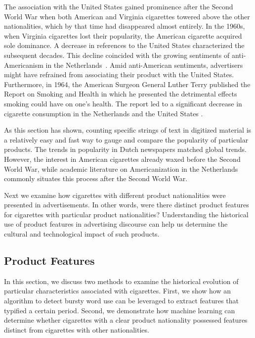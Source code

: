 \documentclass[USenglish]{article}
\begin{document}
The association with the United States gained prominence after the Second World War when both American and Virginia cigarettes towered above the other nationalities, which by that time had disappeared almost entirely. In the 1960s, when Virginia cigarettes lost their popularity, the American cigarette acquired sole dominance. A decrease in references to the United States characterized the subsequent decades.
%
This decline coincided with the growing sentiments of anti-Americanism in the Netherlands~\cite{kroes_european_2006,gienow-hecht_always_2006}. Amid anti-American sentiments, advertisers might have refrained from associating their product with the United States. Furthermore, in 1964, the American Surgeon General Luther Terry published the Report on Smoking and Health in which he presented the detrimental effects smoking could have on one’s health. The report led to a significant decrease in cigarette consumption in the Netherlands and the United States \cite{hoffmann_less_2001}.

As this section has shown, counting specific strings of text in digitized material is a relatively easy and fast way to gauge and compare the popularity of particular products. The trends in popularity in Dutch newspapers matched global trends. However, the interest in American cigarettes already waxed before the Second World War, while academic literature on Americanization in the Netherlands commonly situates this process after the Second World War.

Next we examine how cigarettes with different product nationalities were presented in advertisements. In other words, were there distinct product features for cigarettes with particular product nationalities? Understanding the historical use of product features in advertising discourse can help us determine the cultural and technological impact of such products. 

\subsection{Product Features}
In this section, we discuss two methods to examine the historical evolution of particular characteristics associated with cigarettes. First, we show how an algorithm to detect bursty word use can be leveraged to extract features that typified a certain period. Second, we demonstrate how machine learning can determine whether cigarettes with a clear product nationality possessed features distinct from cigarettes with other nationalities. 
\end{document}
